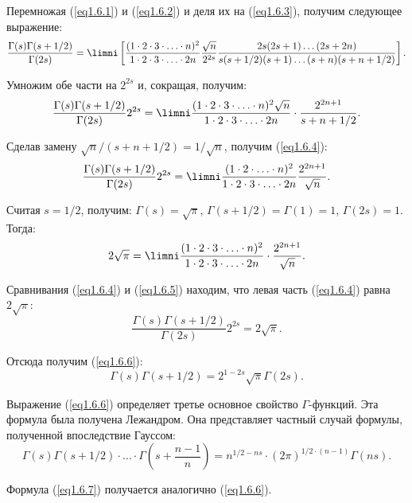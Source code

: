 Перемножая (\ref{eq1.6.1}) и (\ref{eq1.6.2}) и деля их на (\ref{eq1.6.3}),
получим следующее выражение:
\[
    \frac{\Gamma(s)\Gamma(s+1/2)}{\Gamma(2s)} = \limni\left[
    \frac{(1\cdot2\cdot3\cdot\ldots\cdot n)^2}{1\cdot2\cdot3\cdot\ldots\cdot2n} 
    \frac{\sqrt{n}}{2^{2s}}
    \frac{2s(2s+1)\ldots(2s+2n)}{s(s+1/2)(s+1)\ldots(s+n)(s+n+1/2)}\right].
\]

Умножим обе части на \( 2^{2s} \) и, сокращая, получим:
\[
    \frac{\Gamma(s)\Gamma(s+1/2)}{\Gamma(2s)}2^{2s} = 
    \limni\frac{(1\cdot2\cdot3\cdot\ldots\cdot n)^2 \sqrt{n}}
    {1\cdot2\cdot3\cdot\ldots\cdot2n}\cdot\frac{2^{2n+1}}{s+n+1/2}.
\]

Сделав замену \( \sqrt{n}/(s+n+1/2) = 1/\sqrt{n} \), получим (\ref{eq1.6.4}):
\begin{equation}
    \frac{\Gamma(s)\Gamma(s+1/2)}{\Gamma(2s)} 2^{2s} =
    \limni\frac{(1\cdot2\cdot\ldots\cdot n)^2}{1\cdot2\cdot3\cdot\ldots\cdot2n} 
    \frac{2^{2n+1}}{\sqrt{n}}.
    \label{eq1.6.4}
\end{equation}

Считая \( s = 1/2 \), получим: \( \Gamma(s) = \sqrt{\pi} \),
\( \Gamma(s + 1/2) = \Gamma(1) = 1 \), \( \Gamma(2s) = 1 \). Тогда:
\begin{equation}
    2\sqrt{\pi} = \limni\frac{(1\cdot2\cdot3\cdot\ldots\cdot n)^2}
    {1\cdot2\cdot3\cdot\ldots\cdot2n}\cdot\frac{2^{2n+1}}{\sqrt{n}}.
    \label{eq1.6.5}
\end{equation}

Сравнивания (\ref{eq1.6.4}) и (\ref{eq1.6.5}) находим, что левая часть
(\ref{eq1.6.4}) равна \( 2\sqrt{\pi} \):
\[
    \frac{\Gamma(s)\Gamma(s+1/2)}{\Gamma(2s)}2^{2s} = 2\sqrt{\pi}.
\]

Отсюда получим (\ref{eq1.6.6}):
\begin{equation}
    \Gamma(s)\Gamma(s+1/2) = 2^{1-2s}\sqrt{\pi}\Gamma(2s).
    \label{eq1.6.6}
\end{equation}

Выражение (\ref{eq1.6.6}) определяет третье основное свойство
\( \Gamma \)-функций. Эта формула была получена Лежандром. Она представляет
частный случай формулы, полученной впоследствие Гауссом:
\begin{equation}
    \Gamma(s)\Gamma(s+1/2)\cdot\ldots\cdot\Gamma\left(s + \frac{n-1}{n}\right) =
    n^{1/2-ns}\cdot(2\pi)^{1/2\cdot(n-1)}\Gamma(ns).
    \label{eq1.6.7}
\end{equation}

Формула (\ref{eq1.6.7}) получается аналогично (\ref{eq1.6.6}).

